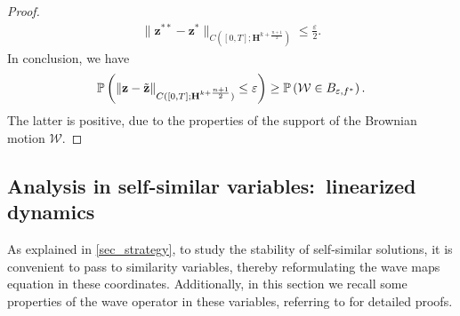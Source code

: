 \documentclass[12pt,reqno]{amsart}
\theoremstyle{plain}
\theoremstyle{remark}
\theoremstyle{plain}
\theoremstyle{definition}
\numberwithin{equation}{section}
\numberwithin{equation}{section}
\newcommand{\eps}{\varepsilon}
\begin{document}
\begin{proof}
		\begin{align*}
			\lVert \mathbf{z}^{**}-{\mathbf{z}}^*\rVert_{C([0,T];\mathbf{H}^{k+\frac{n+1}{2}})}\leq \frac{\eps}{2}.    
		\end{align*}
		In conclusion, we have
		\begin{align*}
			\mathbb{P}\left(\lVert \mathbf{z}-\Tilde{\mathbf{z}}\rVert_{C([0,T];\mathbf{H}^{k+\frac{n+1}{2}})}\leq \eps\right)\geq \mathbb{P}\left(\mathcal{W}\in B_{\eps,f^*} \right). 
		\end{align*}
		The latter is positive, due to the properties of the support of the Brownian motion $\mathcal{W}$.
	\end{proof}
\subsection{Analysis in self-similar variables:~linearized dynamics}\label{prel_self_similar}
	As explained in \autoref{sec_strategy}, to study the stability of self-similar solutions, it is convenient to pass to similarity variables, thereby  reformulating the wave maps equation in these coordinates. Additionally, in this section we recall some properties of the wave operator in these variables, referring to \cite[Sections 4–7]{glogic2025globally} for detailed proofs. 
    
\end{document}
